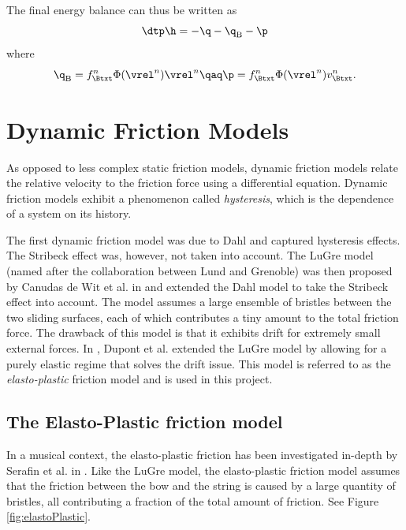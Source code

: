 The final energy balance can thus be written as
\begin{equation}\label{eq:energyBalanceBow}
    \dtp \h = -\q - \q_\text{B} - \p 
\end{equation}
where 
\begin{equation*}
    \q_\text{B} = f_\Btxt^n \Phi(\vrel^n) \vrel^n \qaq \p = f_\Btxt^n \Phi(\vrel^n)v_\Btxt^n.
\end{equation*}

\section{Dynamic Friction Models}
As opposed to less complex static friction models, dynamic friction models relate the relative velocity to the friction force using a differential equation. Dynamic friction models exhibit a phenomenon called \textit{hysteresis}, which is the dependence of a system on its history. 

The first dynamic friction model was due to Dahl \cite{Dahl1968} and captured hysteresis effects. The Stribeck effect was, however, not taken into account. The LuGre model (named after the collaboration between Lund and Grenoble) was then proposed by Canudas de Wit et al. in \cite{Canudas1993, Canudas1995} and extended the Dahl model to take the Stribeck effect into account. The model assumes a large ensemble of bristles between the two sliding surfaces, each of which contributes a tiny amount to the total friction force. The drawback of this model is that it exhibits drift for extremely small external forces. In \cite{Dupont2002}, Dupont et al. extended the LuGre model by allowing for a purely elastic regime that solves the drift issue. This model is referred to as the \textit{elasto-plastic} friction model and is used in this project.

\subsection{The Elasto-Plastic friction model}
In a musical context, the elasto-plastic friction has been investigated in-depth by Serafin et al. in \cite{Serafin2003, Serafin2004, Avanzini2005}. Like the LuGre model, the elasto-plastic friction model assumes that the friction between the bow and the string is caused by a large quantity of bristles, all contributing a fraction of the total amount of friction. See Figure \ref{fig:elastoPlastic}.



